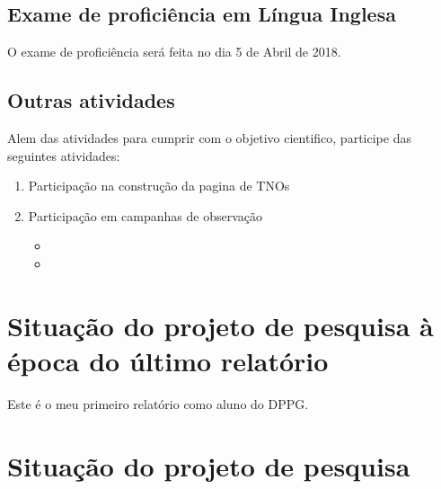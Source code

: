 \documentclass[a4paper, 11pt]{article}
\begin{document}
\subsection{Exame de profici\^encia em L\'ingua Inglesa}

O exame de proficiência será feita no dia 5 de Abril de 2018.

\subsection{Outras atividades}

Alem das atividades para cumprir com o objetivo cientifico, participe das seguintes atividades:

\begin{enumerate}
  \item Participação na construção da pagina de TNOs 
  \item Participação em campanhas de observação 
  \begin{itemize}
    \item 
    \item
  \end{itemize}
\end{enumerate}
\section{Situação do projeto de pesquisa à época do último relatório}
Este é o meu primeiro relatório como aluno do DPPG.

\section{Situa\c{c}\~ao do projeto de pesquisa}
\end{document}
